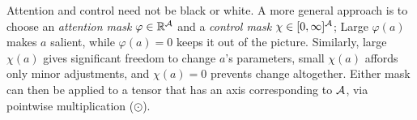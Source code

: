 Attention and control need not be black or white.
A more general approach is to choose
    an \emph{attention mask} $\varphi \in \mathbb R^{\mathcal A}$ and
    a \emph{control mask} $\chi \in [0,\infty]^{\mathcal A}$;
Large $\varphi(a)$ makes $a$ salient, while $\varphi(a) = 0$
    keeps it out of the picture.
Similarly, large $\chi(a)$ gives significant freedom to change $a$'s parameters,
small $\chi(a)$ affords only minor adjustments, and $\chi(a) \!=\! 0$
    prevents change altogether.
Either mask can then be applied to
    a tensor that has an axis corresponding to $\mathcal A$, via
    pointwise multiplication ($\odot$).
%


